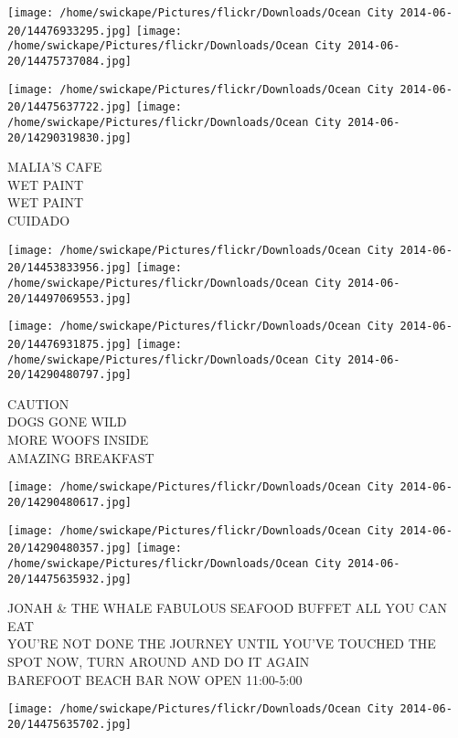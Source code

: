 \documentclass[10pt,letterpaper]{article}
\begin{document}
\texttt{[image: /home/swickape/Pictures/flickr/Downloads/Ocean City 2014-06-20/14476933295.jpg]}
\texttt{[image: /home/swickape/Pictures/flickr/Downloads/Ocean City 2014-06-20/14475737084.jpg]}

\texttt{[image: /home/swickape/Pictures/flickr/Downloads/Ocean City 2014-06-20/14475637722.jpg]}
\texttt{[image: /home/swickape/Pictures/flickr/Downloads/Ocean City 2014-06-20/14290319830.jpg]}

MALIA'S CAFE\\
WET PAINT\\
WET PAINT\\
CUIDADO\\
\pagebreak

\texttt{[image: /home/swickape/Pictures/flickr/Downloads/Ocean City 2014-06-20/14453833956.jpg]}
\texttt{[image: /home/swickape/Pictures/flickr/Downloads/Ocean City 2014-06-20/14497069553.jpg]}

\texttt{[image: /home/swickape/Pictures/flickr/Downloads/Ocean City 2014-06-20/14476931875.jpg]}
\texttt{[image: /home/swickape/Pictures/flickr/Downloads/Ocean City 2014-06-20/14290480797.jpg]}

CAUTION\\
DOGS GONE WILD\\
MORE WOOFS INSIDE\\
AMAZING BREAKFAST\\
\pagebreak

\texttt{[image: /home/swickape/Pictures/flickr/Downloads/Ocean City 2014-06-20/14290480617.jpg]}

\vspace{0.25in}
\texttt{[image: /home/swickape/Pictures/flickr/Downloads/Ocean City 2014-06-20/14290480357.jpg]}
\texttt{[image: /home/swickape/Pictures/flickr/Downloads/Ocean City 2014-06-20/14475635932.jpg]}

JONAH \& THE WHALE FABULOUS SEAFOOD BUFFET ALL YOU CAN EAT\\
YOU'RE NOT DONE THE JOURNEY UNTIL YOU'VE TOUCHED THE SPOT NOW, TURN AROUND AND DO IT AGAIN\\
BAREFOOT BEACH BAR NOW OPEN 11:00{-}5:00\\
\pagebreak

\texttt{[image: /home/swickape/Pictures/flickr/Downloads/Ocean City 2014-06-20/14475635702.jpg]}
\end{document}

